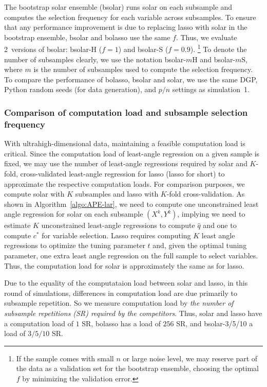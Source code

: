 \documentclass[12pt]{article}
\begin{document}
The bootstrap solar ensemble (bsolar) runs solar on each subsample and computes the selection frequency for each variable across subsamples. To ensure that any performance improvement is due to replacing lasso with solar in the bootstrap ensemble, bsolar and bolasso use the same $f$. Thus, we evaluate 2~versions of bsolar: bsolar-H ($f=1$) and bsolar-S ($f=0.9$). \footnote{If the sample comes with small $n$ or large noise level, we may reserve part of the data as a validation set for the bootstrap ensemble, choosing the optimal $f$ by minimizing the validation error.} To denote the number of subsamples clearly, we use the notation bsolar-$m$H and bsolar-$m$S, where $m$ is the number of subsamples used to compute the selection frequency. To compare the performance of bolasso, bsolar and solar, we use the same DGP, Python random seeds (for data generation), and $p/n$ settings as simulation~1.

\subsubsection*{Comparison of computation load and subsample selection frequency}

With ultrahigh-dimensional data, maintaining a feasible computation load is critical. Since the computation load of least-angle regression on a given sample is fixed, we may use the number of least-angle regressions required by solar and $K$-fold, cross-validated least-angle regression for lasso (lasso for short) to approximate the respective computation loads. For comparison purposes, we compute solar with $K$ subsamples and lasso with $K$-fold cross-validation. As shown in Algorithm~\ref{algo:APE-lar}, we need to compute one unconstrained least angle regression for solar on each subsample $(X^k, Y^k)$, implying we need to estimate $K$ unconstrained least-angle regressions to compute $\widehat{q}$ and one to compute $c^*$ for variable selection. Lasso requires computing $K$ least angle regressions to optimize the tuning parameter $t$ and, given the optimal tuning parameter, one extra least angle regression on the full sample to select variables. Thus, the computation load for solar is approximately the same as for lasso.

Due to the equality of the computataion load between solar and lasso, in this round of simulations, differences in computation load are due primarily to subsample repetition. So we measure computation load by \emph{the number of subsample repetitions (SR) required by the competitors}. Thus, solar and lasso have a computation load of $1$ SR, bolasso has a load of $256$ SR, and bsolar-3/5/10 a load of $3/5/10$ SR.
\end{document}
